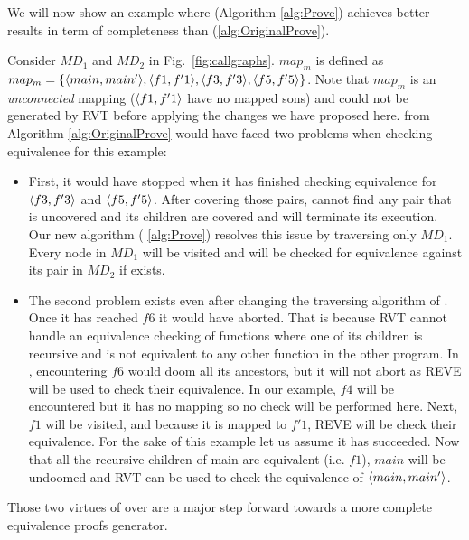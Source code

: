 We will now show an example where  (Algorithm \ref{alg:Prove}) achieves better results in term of completeness than  (\ref{alg:OriginalProve}). 

Consider $MD_1$ and $MD_2$ in Fig.~\ref{fig:callgraphs}. $map_m$ is defined as $map_m = \{ \langle main,main'\rangle,\langle f1,f'1\rangle, \langle f3,f'3\rangle,\langle f5,f'5\rangle\}$. Note that $map_m$ is an \emph{unconnected} mapping ($\langle f1,f'1\rangle$ have no mapped sons) and could not be generated by RVT before applying the changes we have proposed here.  from Algorithm \ref{alg:OriginalProve} would have faced two problems when checking equivalence for this example:
\begin{itemize}
    \item 
First, it would have stopped when it has finished checking equivalence for $\langle f3,f'3\rangle$ and $\langle f5,f'5\rangle$. After covering those pairs,  cannot find any pair that is uncovered and its children are covered and will terminate its execution. Our new algorithm  ( \ref{alg:Prove}) resolves this issue by traversing only $MD_1$. Every node in $MD_1$ will be visited and will be checked for equivalence against its pair in $MD_2$ if exists. 
\item The second problem exists even after changing the traversing algorithm of . Once it has reached $f6$ it would have aborted. That is because RVT cannot handle an equivalence checking of functions where one of its children is recursive and is not equivalent to any other function in the other program. In , encountering $f6$ would doom all its ancestors, but it will not abort as REVE will be used to check their equivalence. In our example, $f4$ will be encountered but it has no mapping so no check will be performed here. Next, $f1$ will be visited, and because it is mapped to $f'1$, REVE will be check their equivalence. For the sake of this example let us assume it has succeeded. Now that all the recursive children of main are equivalent (i.e. $f1$), $main$ will be undoomed and RVT can be used to check the equivalence of $\langle main,main'\rangle$.
\end{itemize}
Those two virtues of  over  are a major step forward towards a more complete equivalence proofs generator.
